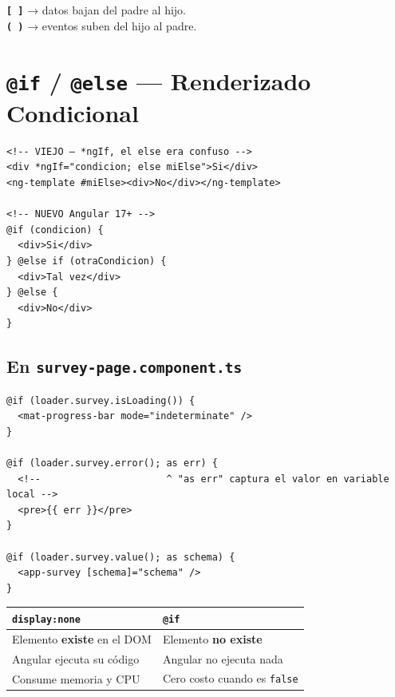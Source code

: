 \documentclass[12pt, a4paper]{article}
\begin{document}
\begin{tcolorbox}[regla, title={\emoji{pushpin} \emoji{label} Regla}]
  \textbf{\texttt{[ ]}} → datos bajan del padre al hijo.\\
  \textbf{\texttt{( )}} → eventos suben del hijo al padre.
\end{tcolorbox}

\section{  \texttt{@if} / \texttt{@else} — Renderizado Condicional}

\begin{lstlisting}
<!-- VIEJO — *ngIf, el else era confuso -->
<div *ngIf="condicion; else miElse">Si</div>
<ng-template #miElse><div>No</div></ng-template>

<!-- NUEVO Angular 17+ -->
@if (condicion) {
  <div>Si</div>
} @else if (otraCondicion) {
  <div>Tal vez</div>
} @else {
  <div>No</div>
}
\end{lstlisting}

\subsection{ En \texttt{survey-page.component.ts}}
\begin{lstlisting}
@if (loader.survey.isLoading()) {
  <mat-progress-bar mode="indeterminate" />
}

@if (loader.survey.error(); as err) {
  <!--                      ^ "as err" captura el valor en variable local -->
  <pre>{{ err }}</pre>
}

@if (loader.survey.value(); as schema) {
  <app-survey [schema]="schema" />
}
\end{lstlisting}

\begin{tcolorbox}[peligro, title={\emoji{warning} \texttt{@if} NO es \texttt{display:none}}]
\begin{center}
\begin{tabular}{p{5.5cm} p{6cm}}
\textbf{\texttt{display:none}} & \textbf{\texttt{@if}} \\
\hline
Elemento \textbf{existe} en el DOM & Elemento \textbf{no existe} \\
Angular ejecuta su código & Angular no ejecuta nada \\
Consume memoria y CPU & Cero costo cuando es \texttt{false} \\
\end{tabular}
\end{center}
\end{tcolorbox}
\end{document}
